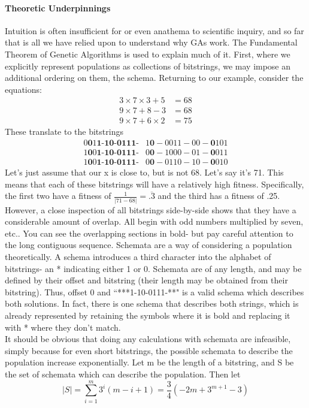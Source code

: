 \paragraph{Theoretic Underpinnings}
Intuition is often insufficient for or even anathema to scientific inquiry, and so far that is all we have relied upon to understand why GAs work.  The Fundamental Theorem of Genetic Algorithms is used to explain much of it.  First, where we explicitly represent populations as collections of bitstrings, we may impose an additional ordering on them, the schema.  Returning to our example, consider the equations: \begin{align*}
3 \times 7 \times 3 + 5 &= 68\\
9 \times 7 + 8 - 3 &= 68\\
9 \times 7 + 6 \times 2 &= 75
\end{align*}  
These translate to the bitstrings
\begin{align*}
0\textbf{0}1\textbf{1-10-0111-}&1\textbf{0}-0011-00-\textbf{0}101\\
1\textbf{0}0\textbf{1-10-0111-}&0\textbf{0}-1000-01-\textbf{0}011\\
1\textbf{0}0\textbf{1-10-0111-}&0\textbf{0}-0110-10-\textbf{0}010
\end{align*}
Let's just assume that our x is close to, but is not 68.  Let's say it's 71.  This means that each of these bitstrings will have a relatively high fitness.  Specifically, the first two have a fitness of $\frac{1}{|71-68|}=\overline{.3}$ and the third has a fitness of .25.   However, a close inspection of all bitstrings side-by-side shows that they have a considerable amount of overlap.  All begin with odd numbers multiplied by seven, etc..  You can see the overlapping sections in bold- but pay careful attention to the long contiguous sequence.
Schemata are a way of considering a population theoretically.  A schema introduces a third character into the alphabet of bitstrings- an * indicating either 1 or 0.  Schemata are of any length, and may be defined by their offset and bitstring (their length may be obtained from their bitstring).  Thus, offset 0 and ``***1-10-0111-**" is a valid schema which describes both solutions.  In fact, there is one schema that describes both strings, which is already represented by retaining the symbols where it is bold and replacing it with * where they don't match.\\It should be obvious that doing any calculations with schemata are infeasible, simply because for even short bitstrings, the possible schemata to describe the population increase exponentially. Let m be the length of a bitstring, and S be the set of schemata which can describe the population.  Then let \begin{equation*}
	|S|=\sum_{i=1}^{m}3^i(m-i+1) = \frac{3}{4}(-2m+3^{m+1}-3)
	\end{equation*}
